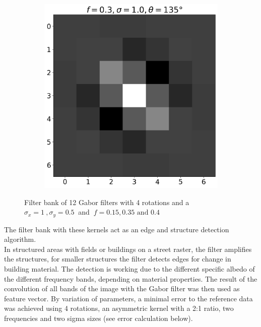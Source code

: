 \documentclass[12pt,a4paper, english,twoside]{scrartcl}
\begin{document}
\begin{figure}[!htbp]
\begin{subfigure}[b]{0.3\textwidth}
      \end{subfigure}
      \begin{subfigure}[b]{0.3\textwidth}
        \includegraphics[width=\textwidth]{img/K11.png}
      \end{subfigure}
      \caption{Filter bank of 12 Gabor filters with 4 rotations and a $\sigma_x=1\ ,\sigma_y = 0.5\ $ and $\ f = 0.15, 0.35 \text{ and } 0.4$\label{fig:gaborbank}}%
    \end{figure}
    \noindent
    The filter bank with these kernels act as an edge and structure detection algorithm.\\
    In structured areas with fields or buildings on a street raster, the filter amplifies the structures, for smaller structures the filter detects edges for change in building material. 
    The detection is working due to the different specific albedo of the different frequency bands, depending on material properties. 
    \noindent 
      The result of the convolution of all bands of the image with the Gabor filter was then used as feature vector. 
      By variation of parameters, a minimal error to the reference data was achieved using 4 rotations, an asymmetric kernel with a 2:1 ratio, two frequencies and two sigma sizes (see error calculation below).
\end{document}
